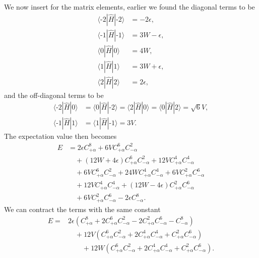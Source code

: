 \documentclass[a4paper, 11pt, notitlepage, english]{article}
\newcommand{\op}[1]{\hat{#1}}
\newcommand{\braopket}[3]{\langle #1 | {#2} | #3 \rangle}
\newcommand{\eps}{\epsilon}
\newcommand{\m}{\text{-}}
\begin{document}
We now insert for the matrix elements, earlier we found the diagonal terms to be
\begin{align*}
\braopket{\m 2}{\op{H}}{\m 2} &= -2\eps, \\
\braopket{\m 1}{\op{H}}{\m 1} &= 3W-\eps,  \\
\braopket{0}{\op{H}}{0} &= 4W, \\
\braopket{1}{\op{H}}{1} &= 3W+\eps, \\
\braopket{2}{\op{H}}{2} &= 2\eps,
\end{align*}
and the off-diagonal terms to be
\begin{align*}
\braopket{\m 2}{\op{H}}{0} &= \braopket{0}{\op{H}}{\m 2} = \braopket{2}{\op{H}}{0} = \braopket{0}{\op{H}}{2} = \sqrt{6}V,\\
\braopket{\m 1}{\op{H}}{ 1} &= \braopket{1}{\op{H}}{\m 1} = 3V.
\end{align*}
The expectation value then becomes
\begin{align*}
E &=  
2\eps C_{+\alpha}^{8}
+ 6VC_{+\alpha}^{6}C_{-\alpha}^{2}  \\
&\quad+ (12W+4\eps)C_{+\alpha}^{6}C_{-\alpha}^{2} 
+ 12V C_{+\alpha}^{4}C_{-\alpha}^{4} \\ 
&\quad+ 6V C_{+\alpha}^{6}C_{-\alpha}^{2} 
+ 24W C_{+\alpha}^{4}C_{-\alpha}^{4}  
+ 6VC_{+\alpha}^{2}C_{-\alpha}^{6}  \\
&\quad+ 12V C_{+\alpha}^4 C_{-\alpha}^4  
+ (12W-4\eps) C_{+\alpha}^2 C_{-\alpha}^6  \\ 
&\quad+ 6V C_{+\alpha}^{2}C_{-\alpha}^{6}  
- 2\eps C_{-\alpha}^{8}.
\end{align*}
We can contract the terms with the same constant
\begin{align*}
E =  
&2\eps(C_{+\alpha}^{8} + 2C_{+\alpha}^{6}C_{-\alpha}^{2} - 2C_{+\alpha}^{2}C_{-\alpha}^{6} - C_{-\alpha}^{8}) \\
&\quad+ 12V(C_{+\alpha}^{6}C_{-\alpha}^{2} + 2C_{+\alpha}^{4}C_{-\alpha}^{4} +  C_{+\alpha}^{2}C_{-\alpha}^{6}) \\
&\qquad+ 12W(C_{+\alpha}^{6}C_{-\alpha}^{2} + 2C_{+\alpha}^{4}C_{-\alpha}^{4} +  C_{+\alpha}^{2}C_{-\alpha}^{6}).
\end{align*}
\end{document}

